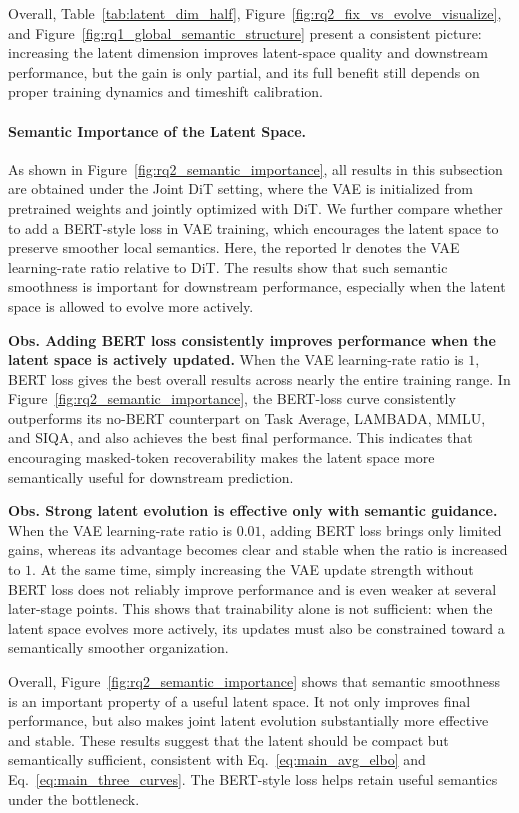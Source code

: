 Overall, Table~\ref{tab:latent_dim_half}, Figure~\ref{fig:rq2_fix_vs_evolve_visualize}, and Figure~\ref{fig:rq1_global_semantic_structure} present a consistent picture: increasing the latent dimension improves latent-space quality and downstream performance, but the gain is only partial, and its full benefit still depends on proper training dynamics and timeshift calibration.

\paragraph{Semantic Importance of the Latent Space. }
As shown in Figure~\ref{fig:rq2_semantic_importance}, all results in this subsection are obtained under the Joint DiT setting, where the VAE is initialized from pretrained weights and jointly optimized with DiT. We further compare whether to add a BERT-style loss in VAE training, which encourages the latent space to preserve smoother local semantics. Here, the reported lr denotes the VAE learning-rate ratio relative to DiT. The results show that such semantic smoothness is important for downstream performance, especially when the latent space is allowed to evolve more actively.

\textbf{Obs.  Adding BERT loss consistently improves performance when the latent space is actively updated.}
When the VAE learning-rate ratio is $1$, BERT loss gives the best overall results across nearly the entire training range. In Figure~\ref{fig:rq2_semantic_importance}, the BERT-loss curve consistently outperforms its no-BERT counterpart on Task Average, LAMBADA, MMLU, and SIQA, and also achieves the best final performance. This indicates that encouraging masked-token recoverability makes the latent space more semantically useful for downstream prediction.

\textbf{Obs.  Strong latent evolution is effective only with semantic guidance.}
When the VAE learning-rate ratio is $0.01$, adding BERT loss brings only limited gains, whereas its advantage becomes clear and stable when the ratio is increased to $1$. At the same time, simply increasing the VAE update strength without BERT loss does not reliably improve performance and is even weaker at several later-stage points. This shows that trainability alone is not sufficient: when the latent space evolves more actively, its updates must also be constrained toward a semantically smoother organization.

Overall, Figure~\ref{fig:rq2_semantic_importance} shows that semantic smoothness is an important property of a useful latent space. It not only improves final performance, but also makes joint latent evolution substantially more effective and stable. These results suggest that the latent should be compact but semantically sufficient, consistent with Eq.~\eqref{eq:main_avg_elbo} and Eq.~\eqref{eq:main_three_curves}. The BERT-style loss helps retain useful semantics under the bottleneck.

